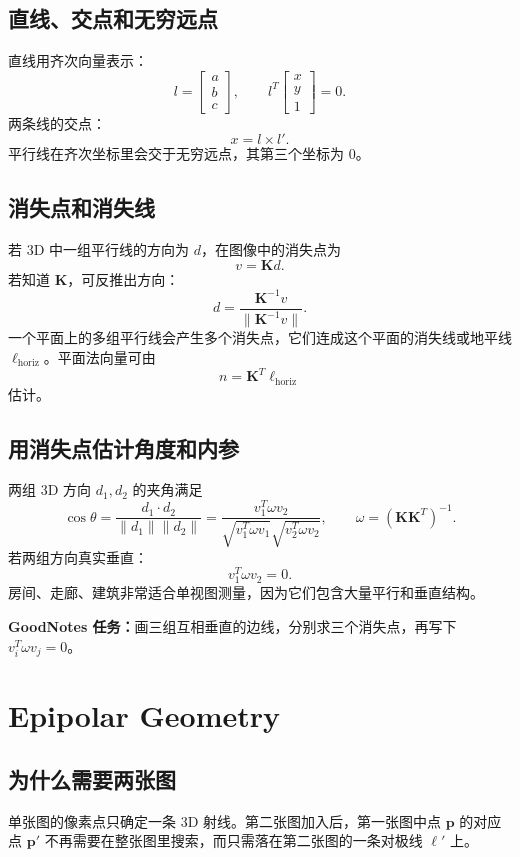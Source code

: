 \documentclass[11pt]{article}
\newcommand{\K}{\mathbf{K}}
\newcommand{\p}{\mathbf{p}}
\newcommand{\goodnotes}[1]{\textbf{GoodNotes 任务：}#1}
\begin{document}
\subsection{直线、交点和无穷远点}

直线用齐次向量表示：
\[
  l =
  \begin{bmatrix}
    a\\b\\c
  \end{bmatrix},\qquad
  l^T
  \begin{bmatrix}
    x\\y\\1
  \end{bmatrix}=0.
\]
两条线的交点：
\[
  x = l\times l'.
\]
平行线在齐次坐标里会交于无穷远点，其第三个坐标为 0。

\subsection{消失点和消失线}

若 3D 中一组平行线的方向为 $d$，在图像中的消失点为
\[
  v = \K d.
\]
若知道 $\K$，可反推出方向：
\[
  d = \frac{\K^{-1}v}{\|\K^{-1}v\|}.
\]
一个平面上的多组平行线会产生多个消失点，它们连成这个平面的消失线或地平线 $\ell_{\text{horiz}}$。平面法向量可由
\[
  n = \K^T\ell_{\text{horiz}}
\]
估计。

\subsection{用消失点估计角度和内参}

两组 3D 方向 $d_1,d_2$ 的夹角满足
\[
  \cos\theta =
  \frac{d_1\cdot d_2}{\|d_1\|\|d_2\|}
  =
  \frac{v_1^T\omega v_2}
  {\sqrt{v_1^T\omega v_1}\sqrt{v_2^T\omega v_2}},
\qquad
  \omega=(\K\K^T)^{-1}.
\]
若两组方向真实垂直：
\[
  v_1^T\omega v_2=0.
\]
房间、走廊、建筑非常适合单视图测量，因为它们包含大量平行和垂直结构。

\goodnotes{画三组互相垂直的边线，分别求三个消失点，再写下 $v_i^T\omega v_j=0$。}

\section{Epipolar Geometry}

\subsection{为什么需要两张图}

单张图的像素点只确定一条 3D 射线。第二张图加入后，第一张图中点 $\p$ 的对应点 $\p'$ 不再需要在整张图里搜索，而只需落在第二张图的一条对极线 $\ell'$ 上。
\end{document}
